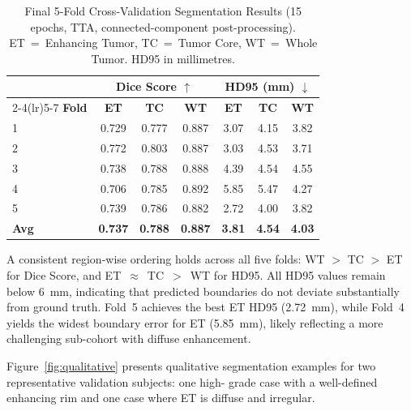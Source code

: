 \documentclass[10pt,twocolumn]{article}
\begin{document}
\begin{table}[h]
\centering
\caption{Final 5-Fold Cross-Validation Segmentation Results
  (15 epochs, TTA, connected-component post-processing).
  ET~=~Enhancing Tumor, TC~=~Tumor Core, WT~=~Whole Tumor.
  HD95 in millimetres.}
\label{tab:results}
\small
\setlength{\tabcolsep}{4pt}
\begin{tabular}{lcccccc}
\toprule
 & \multicolumn{3}{c}{\textbf{Dice Score $\uparrow$}} &
   \multicolumn{3}{c}{\textbf{HD95 (mm) $\downarrow$}} \\
\cmidrule(lr){2-4}\cmidrule(lr){5-7}
\textbf{Fold} & \textbf{ET} & \textbf{TC} & \textbf{WT} &
               \textbf{ET} & \textbf{TC} & \textbf{WT} \\
\midrule
1 & 0.729 & 0.777 & 0.887 & 3.07 & 4.15 & 3.82 \\
2 & 0.772 & 0.803 & 0.887 & 3.03 & 4.53 & 3.71 \\
3 & 0.738 & 0.788 & 0.888 & 4.39 & 4.54 & 4.55 \\
4 & 0.706 & 0.785 & 0.892 & 5.85 & 5.47 & 4.27 \\
5 & 0.739 & 0.786 & 0.882 & 2.72 & 4.00 & 3.82 \\
\midrule
\textbf{Avg} & \textbf{0.737} & \textbf{0.788} & \textbf{0.887}
             & \textbf{3.81} & \textbf{4.54} & \textbf{4.03} \\
\bottomrule
\end{tabular}
\end{table}

A consistent region-wise ordering holds across all five folds:
WT $>$ TC $>$ ET for Dice Score, and ET~$\approx$~TC~$>$~WT for
HD95. All HD95 values remain below 6~mm, indicating that
predicted boundaries do not deviate substantially from ground
truth. Fold~5 achieves the best ET HD95 (2.72~mm), while Fold~4
yields the widest boundary error for ET (5.85~mm), likely
reflecting a more challenging sub-cohort with diffuse enhancement.

Figure~\ref{fig:qualitative} presents qualitative segmentation
examples for two representative validation subjects: one high-
grade case with a well-defined enhancing rim and one case where
ET is diffuse and irregular.
\end{document}
